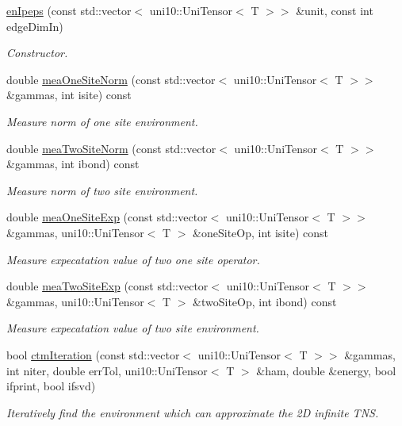 \begin{DoxyCompactItemize}
\item 
\hyperlink{classenIpeps_a1108c1521ab6b3a69f169098ad7b90d6}{en\+Ipeps} (const std\+::vector$<$ uni10\+::\+Uni\+Tensor$<$ T $>$$>$ \&unit, const int edge\+Dim\+In)
\begin{DoxyCompactList}\small\item\em Constructor. \end{DoxyCompactList}\item 
double \hyperlink{classenIpeps_a93f82d721d8b302eaa600be2a6c5b281}{mea\+One\+Site\+Norm} (const std\+::vector$<$ uni10\+::\+Uni\+Tensor$<$ T $>$$>$ \&gammas, int isite) const 
\begin{DoxyCompactList}\small\item\em Measure norm of one site environment. \end{DoxyCompactList}\item 
double \hyperlink{classenIpeps_a7c0b7d6efa8708316e8e856d5d85a488}{mea\+Two\+Site\+Norm} (const std\+::vector$<$ uni10\+::\+Uni\+Tensor$<$ T $>$$>$ \&gammas, int ibond) const 
\begin{DoxyCompactList}\small\item\em Measure norm of two site environment. \end{DoxyCompactList}\item 
double \hyperlink{classenIpeps_abfb60c5f5d056593bd56a70e8866344c}{mea\+One\+Site\+Exp} (const std\+::vector$<$ uni10\+::\+Uni\+Tensor$<$ T $>$$>$ \&gammas, uni10\+::\+Uni\+Tensor$<$ T $>$ \&one\+Site\+Op, int isite) const 
\begin{DoxyCompactList}\small\item\em Measure expecatation value of two one site operator. \end{DoxyCompactList}\item 
double \hyperlink{classenIpeps_a341c12d0e2f4044a533b538f2eedcfa3}{mea\+Two\+Site\+Exp} (const std\+::vector$<$ uni10\+::\+Uni\+Tensor$<$ T $>$$>$ \&gammas, uni10\+::\+Uni\+Tensor$<$ T $>$ \&two\+Site\+Op, int ibond) const 
\begin{DoxyCompactList}\small\item\em Measure expecatation value of two site environment. \end{DoxyCompactList}\item 
bool \hyperlink{classenIpeps_a7211d6a9727da3a2c38c14a03d6b7a58}{ctm\+Iteration} (const std\+::vector$<$ uni10\+::\+Uni\+Tensor$<$ T $>$$>$ \&gammas, int niter, double err\+Tol, uni10\+::\+Uni\+Tensor$<$ T $>$ \&ham, double \&energy, bool ifprint, bool ifsvd)
\begin{DoxyCompactList}\small\item\em Iteratively find the environment which can approximate the 2D infinite T\+NS. \end{DoxyCompactList}\end{DoxyCompactItemize}
